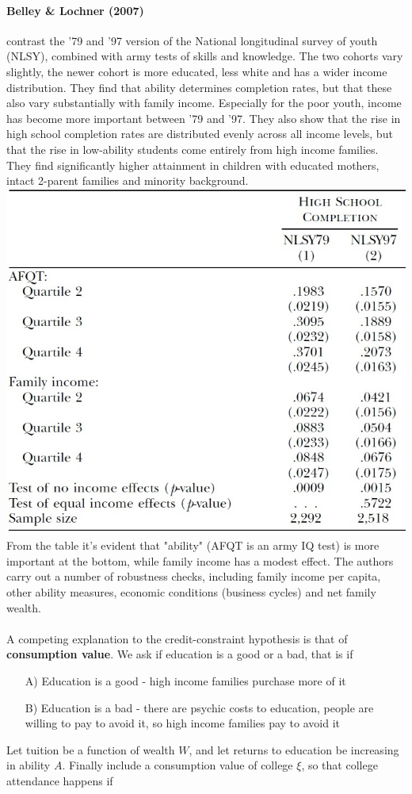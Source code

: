 \documentclass[12pt, a4paper]{article}
\begin{document}
\begin{multicols}{2}
\paragraph{Belley \& Lochner (2007)} contrast the '79 and '97 version of the National longitudinal survey of youth (NLSY), combined with army tests of skills and knowledge. The two cohorts vary slightly, the newer cohort is more educated, less white and has a wider income distribution. They find that ability determines completion rates, but that these also vary substantially with family income. Especially for the poor youth, income has become more important between '79 and '97. They also show that the rise in high school completion rates are distributed evenly across all income levels, but that the rise in low-ability students come entirely from high income families. They find significantly higher attainment in children with educated mothers, intact 2-parent families and minority background.
\includegraphics[width = 0.45 \textwidth]{belleyL.jpg}
From the table it's evident that "ability" (AFQT is an army IQ test) is more important at the bottom, while family income has a modest effect.
The authors carry out a number of robustness checks, including family income per capita, other ability measures, economic conditions (business cycles) and net family wealth.
\\ \\
A competing explanation to the credit-constraint hypothesis is that of \textbf{consumption value}. We ask if education is a good or a bad, that is if
\begin{itemize}
\item[A)] Education is a good - high income families purchase more of it
\item[B)] Education is a bad - there are psychic costs to education, people are willing to pay to avoid it, so high income families pay to avoid it
\end{itemize}
Let tuition be a function of wealth $W$, and let returns to education be increasing in ability $A$. Finally include a consumption value of college $\xi$, so that college attendance happens if

\end{multicols}
\end{document}
